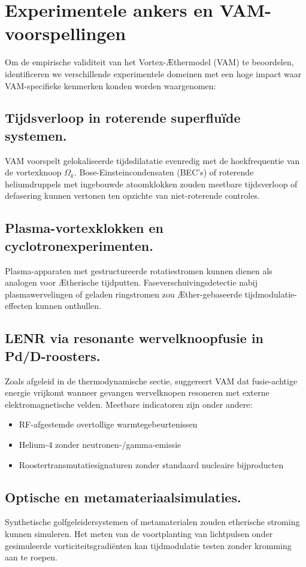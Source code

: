 \section{Experimentele ankers en VAM-voorspellingen}

Om de empirische validiteit van het Vortex-Æthermodel (VAM) te beoordelen, identificeren we verschillende experimentele domeinen met een hoge impact waar VAM-specifieke kenmerken konden worden waargenomen:

\subsection{Tijdsverloop in roterende superfluïde systemen.} VAM voorspelt gelokaliseerde tijdsdilatatie evenredig met de hoekfrequentie van de vortexknoop
$\Omega_k$. Bose-Einsteincondensaten (BEC's) of roterende heliumdruppels met ingebouwde atoomklokken zouden meetbare tijdsverloop of defasering kunnen vertonen ten opzichte van niet-roterende controles.

\subsection{Plasma-vortexklokken en cyclotronexperimenten.} Plasma-apparaten met gestructureerde rotatiestromen kunnen dienen als analogen voor Ætherische tijdputten. Faseverschuivingsdetectie nabij plasmawervelingen of geladen ringstromen zou Æther-gebaseerde tijdmodulatie-effecten kunnen onthullen.

\subsection{LENR via resonante wervelknoopfusie in Pd/D-roosters.} Zoals afgeleid in de thermodynamische sectie, suggereert VAM dat fusie-achtige energie vrijkomt wanneer gevangen wervelknopen resoneren met externe elektromagnetische velden. Meetbare indicatoren zijn onder andere:
\begin{itemize}
\item RF-afgestemde overtollige warmtegebeurtenissen
\item Helium-4 zonder neutronen-/gamma-emissie
\item Roostertransmutatiesignaturen zonder standaard nucleaire bijproducten
\end{itemize}

\subsection{Optische en metamateriaalsimulaties.} Synthetische golfgeleidersystemen of metamaterialen zouden etherische stroming kunnen simuleren. Het meten van de voortplanting van lichtpulsen onder gesimuleerde vorticiteitsgradiënten kan tijdmodulatie testen zonder kromming aan te roepen.

